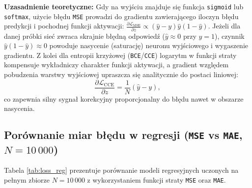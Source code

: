 \documentclass{article}
\begin{document}
\textbf{Uzasadnienie teoretyczne:} Gdy na wyjściu znajduje się funkcja \texttt{sigmoid} lub \texttt{softmax}, użycie błędu \texttt{MSE} prowadzi do gradientu zawierającego iloczyn błędu predykcji i pochodnej funkcji aktywacji: $\frac{\partial \mathcal{L}_{\text{MSE}}}{\partial z} \propto (\hat{y} - y)\hat{y}(1-\hat{y})$. Jeżeli dla danej próbki sieć zwraca skrajnie błędną odpowiedź ($\hat{y} \approx 0$ przy $y = 1$), czynnik $\hat{y}(1-\hat{y}) \approx 0$ powoduje nasycenie (saturację) neuronu wyjściowego i wygaszenie gradientu. Z kolei dla entropii krzyżowej (\texttt{BCE}/\texttt{CCE}) logarytm w funkcji straty kompensuje wykładniczy charakter funkcji aktywacji, a gradient względem pobudzenia warstwy wyjściowej upraszcza się analitycznie do postaci liniowej:
\begin{equation}
    \frac{\partial \mathcal{L}_{\text{CCE}}}{\partial z} = \frac{1}{N}(\hat{y} - y),
\end{equation}
co zapewnia silny sygnał korekcyjny proporcjonalny do błędu nawet w obszarze nasycenia.

\subsection{Porównanie miar błędu w regresji (\texttt{MSE} vs \texttt{MAE}, $N = 10\,000$)}

Tabela \ref{tab:loss_reg} prezentuje porównanie modeli regresyjnych uczonych na pełnym zbiorze $N = 10\,000$ z wykorzystaniem funkcji straty \texttt{MSE} oraz \texttt{MAE}.
\end{document}
